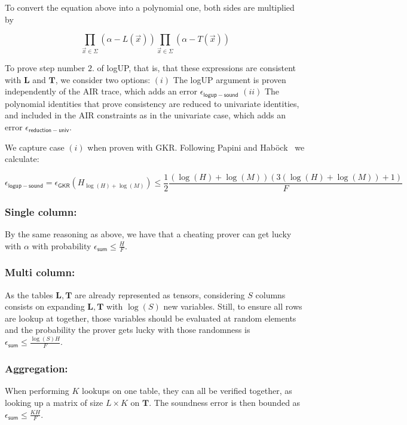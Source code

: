 To convert the equation above into a polynomial one, both sides are multiplied by 

$$\prod_{\vec x\in \Sigma}(\alpha - L(\vec x))\prod_{\vec x\in \Sigma}(\alpha - T(\vec x))$$

To prove step number $2.$ of logUP, that is, that these expressions are consistent with $\mathbf L$ and $\mathbf T$, we consider two options: 
$(i)$ The logUP argument is proven independently of the AIR trace, which adds an error $\epsilon_{\mathsf{logup-sound}}$
$(ii)$ The polynomial identities that prove consistency are reduced to univariate identities, and included in the AIR constraints as in the univariate case, which adds an error $\epsilon_{\mathsf{reduction-univ}}$.

We capture case $(i)$ when proven with GKR. Following Papini and Haböck~\cite{logup-GKR} we calculate:

$$\epsilon_{\mathsf{logup-sound}}=\epsilon_{\mathsf{GKR}}(H_{\log(H)+\log(M)})\leq \frac{1}{2}\frac{(\log(H)+\log(M))(3(\log(H)+\log(M))+1)}{F}$$

\subsubsection{Single column:}

By the same reasoning as above, we have that a cheating prover can get lucky with $\alpha$ with probability $\epsilon_{\mathsf{sum}}\leq \frac{H}{F}$. 

\subsubsection{Multi column:}

As the tables $\mathbf L, \mathbf T$ are already represented as tensors, considering $S$ columns consists on expanding $\mathbf L, \mathbf T$ with $\log (S)$ new variables. Still, to ensure all rows are lookup at together, those variables should be evaluated at random elements and the probability the prover gets lucky with those randomness is $\epsilon_{\mathsf{sum}}\leq \frac{\log(S) H}{F}$.

\subsubsection{Aggregation:}

When performing $K$ lookups on one table, they can all be verified together, as looking up a matrix of size $L\times K$ on  $\mathbf T$.
The soundness error is then bounded as $\epsilon_{\mathsf{sum}}\leq \frac{KH}{F}$.


